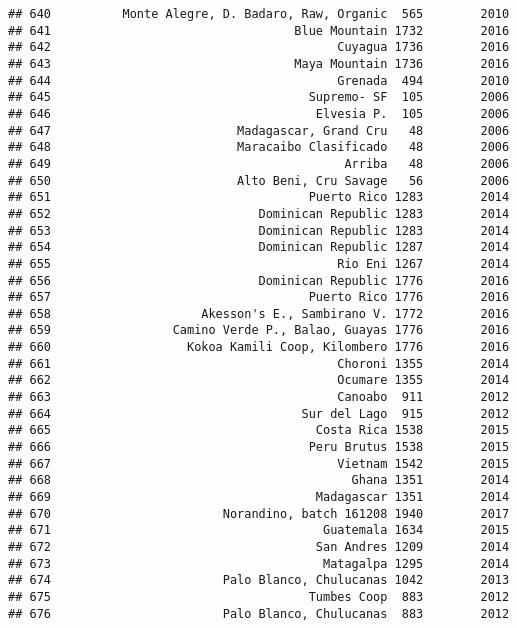 \documentclass[
]{article}
\begin{document}
\begin{verbatim}
## 640          Monte Alegre, D. Badaro, Raw, Organic  565        2010
## 641                                  Blue Mountain 1732        2016
## 642                                        Cuyagua 1736        2016
## 643                                  Maya Mountain 1736        2016
## 644                                        Grenada  494        2010
## 645                                    Supremo- SF  105        2006
## 646                                     Elvesia P.  105        2006
## 647                          Madagascar, Grand Cru   48        2006
## 648                          Maracaibo Clasificado   48        2006
## 649                                         Arriba   48        2006
## 650                          Alto Beni, Cru Savage   56        2006
## 651                                    Puerto Rico 1283        2014
## 652                             Dominican Republic 1283        2014
## 653                             Dominican Republic 1283        2014
## 654                             Dominican Republic 1287        2014
## 655                                        Rio Eni 1267        2014
## 656                             Dominican Republic 1776        2016
## 657                                    Puerto Rico 1776        2016
## 658                     Akesson's E., Sambirano V. 1772        2016
## 659                 Camino Verde P., Balao, Guayas 1776        2016
## 660                   Kokoa Kamili Coop, Kilombero 1776        2016
## 661                                        Choroni 1355        2014
## 662                                        Ocumare 1355        2014
## 663                                        Canoabo  911        2012
## 664                                   Sur del Lago  915        2012
## 665                                     Costa Rica 1538        2015
## 666                                    Peru Brutus 1538        2015
## 667                                        Vietnam 1542        2015
## 668                                          Ghana 1351        2014
## 669                                     Madagascar 1351        2014
## 670                        Norandino, batch 161208 1940        2017
## 671                                      Guatemala 1634        2015
## 672                                     San Andres 1209        2014
## 673                                      Matagalpa 1295        2014
## 674                        Palo Blanco, Chulucanas 1042        2013
## 675                                    Tumbes Coop  883        2012
## 676                        Palo Blanco, Chulucanas  883        2012

\end{verbatim}
\end{document}
